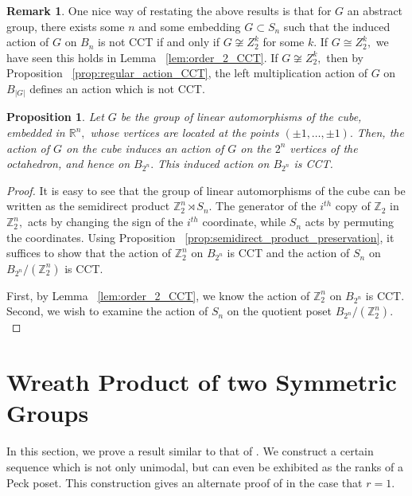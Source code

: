 \documentclass[10 pt]{amsart}
\theoremstyle{plain}
\newtheorem{prop}[thm]{Proposition}
\theoremstyle{definition}
\newtheorem{rem}[thm]{Remark}
\theoremstyle{remark}
\numberwithin{equation}{section}
\newcommand\BR{{\mathbb R}}
\newcommand\BZ{{\mathbb Z}}
\begin{document}
\begin{rem}
One nice way of restating the above results is that for $G$ an abstract group, there exists some $n$ and some embedding $G \subset S_n$ such that the induced action of $G$ on $B_n$ is not CCT if and only if $G \not \cong Z_2^k$ for some $k.$ If $G\cong Z_2^k,$ we have seen this holds in Lemma ~\ref{lem:order_2_CCT}. If $G \not \cong Z_2^k,$ then by Proposition ~\ref{prop:regular_action_CCT}, the left multiplication action of $G$ on $B_{|G|}$ defines an action which is not CCT.
\end{rem}
\begin{prop}
Let $G$ be the group of linear automorphisms of the cube, embedded in $\BR^n,$ whose vertices are located at the points $(\pm 1, \ldots, \pm 1).$ Then, the action of $G$ on the cube induces an action of $G$ on the $2^n$ vertices of the octahedron, and hence on $B_{2^n}.$ This induced action on $B_{2^n}$ is CCT. 
\end{prop}
\begin{proof}
It is easy to see that the group of linear automorphisms of the cube can be written as the semidirect product $\BZ^n_2 \rtimes S_n.$ The generator of the $i^{th}$ copy of $\BZ_2$ in $\BZ^n_2,$ acts by changing the sign of the $i^{th}$ coordinate, while $S_n$ acts by permuting the coordinates. Using Proposition ~\ref{prop:semidirect_product_preservation}, it suffices to show that the action of $\BZ_2^n$ on $B_{2^n}$ is CCT and the action of $S_n$ on $B_{2^n}/(\BZ_2^n)$ is CCT.

First, by Lemma ~\ref{lem:order_2_CCT}, we know the action of $\BZ_2^n$ on $B_{2^n}$ is CCT. Second, we wish to examine the action of $S_n$ on the quotient poset $B_{2^n}/(\BZ_2^n).$ 
\end{proof}
\fi






\section{Wreath Product of two Symmetric Groups}\label{sec:wreath_product}

In this section, we prove a result similar to that of \cite[Theorem 1.1]{pak}. We construct a certain sequence which is not only unimodal, but can even be exhibited as the ranks of a Peck poset. This construction gives an alternate proof of \cite[Theorem 1.1]{pak} in the case that $r = 1.$
\end{document}
